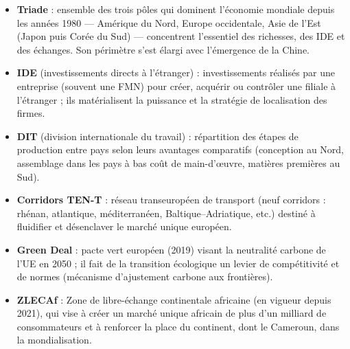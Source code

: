 \documentclass[11pt]{article}
\newcommand{\cle}[1]{{\popxbold\color{popdark}#1}}
\begin{document}
\begin{corrige}
\begin{itemize}
\item \textbf{\cle{Triade}} : ensemble des trois pôles qui dominent l'économie mondiale depuis les années 1980 — Amérique du Nord, Europe occidentale, Asie de l'Est (Japon puis Corée du Sud) — concentrent l'essentiel des richesses, des IDE et des échanges. Son périmètre s'est élargi avec l'émergence de la Chine.
\item \textbf{\cle{IDE}} (investissements directs à l'étranger) : investissements réalisés par une entreprise (souvent une FMN) pour créer, acquérir ou contrôler une filiale à l'étranger ; ils matérialisent la puissance et la stratégie de localisation des firmes.
\item \textbf{\cle{DIT}} (division internationale du travail) : répartition des étapes de production entre pays selon leurs avantages comparatifs (conception au Nord, assemblage dans les pays à bas coût de main-d'œuvre, matières premières au Sud).
\item \textbf{\cle{Corridors TEN-T}} : réseau transeuropéen de transport (neuf corridors : rhénan, atlantique, méditerranéen, Baltique--Adriatique, etc.) destiné à fluidifier et désenclaver le marché unique européen.
\item \textbf{\cle{Green Deal}} : pacte vert européen (2019) visant la neutralité carbone de l'UE en 2050 ; il fait de la transition écologique un levier de compétitivité et de normes (mécanisme d'ajustement carbone aux frontières).
\item \textbf{\cle{ZLECAf}} : Zone de libre-échange continentale africaine (en vigueur depuis 2021), qui vise à créer un marché unique africain de plus d'un milliard de consommateurs et à renforcer la place du continent, dont le Cameroun, dans la mondialisation.
\end{itemize}
\end{corrige}
\end{document}
